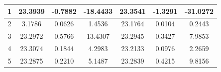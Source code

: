 \documentclass[report.tex]{subfiles}
\begin{document}
\begin{table}[H]
{\begin{tabular}{c|ccc|ccc|}
    \multicolumn{1}{|c|}{1}     & \multicolumn{1}{c|}{23.3939}                                                       & \multicolumn{1}{c|}{-0.7882}                                                       & -18.4433                                                               & \multicolumn{1}{c|}{23.3541}                                                       & \multicolumn{1}{c|}{-1.3291}                                                       & -31.0272                                                               \\ \hline
    \multicolumn{1}{|c|}{2}     & \multicolumn{1}{c|}{3.1786}                                                        & \multicolumn{1}{c|}{0.0626}                                                        & 1.4536                                                                 & \multicolumn{1}{c|}{23.1764}                                                       & \multicolumn{1}{c|}{0.0104}                                                        & 0.2443                                                                 \\ \hline
    \multicolumn{1}{|c|}{3}     & \multicolumn{1}{c|}{23.2972}                                                       & \multicolumn{1}{c|}{0.5766}                                                        & 13.4307                                                                & \multicolumn{1}{c|}{23.2945}                                                       & \multicolumn{1}{c|}{0.3427}                                                        & 7.9853                                                                 \\ \hline
    \multicolumn{1}{|c|}{4}     & \multicolumn{1}{c|}{23.3074}                                                       & \multicolumn{1}{c|}{0.1844}                                                        & 4.2983                                                                 & \multicolumn{1}{c|}{23.2133}                                                       & \multicolumn{1}{c|}{0.0976}                                                        & 2.2659                                                                 \\ \hline
    \multicolumn{1}{|c|}{5}     & \multicolumn{1}{c|}{23.2875}                                                       & \multicolumn{1}{c|}{0.2210}                                                        & 5.1487                                                                 & \multicolumn{1}{c|}{23.2839}                                                       & \multicolumn{1}{c|}{0.4215}                                                        & 9.8156                                                                 \\ \hline

\end{tabular}}
\end{table}
\end{document}
